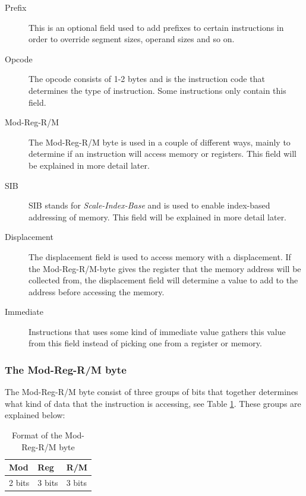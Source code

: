 \documentclass[11pt,twoside]{eitExjobb}
\begin{document}
\begin{description}
\item[Prefix] This is an optional field used to add prefixes to certain instructions in order to override segment sizes, operand sizes and so on.
\item[Opcode] The opcode consists of 1-2 bytes and is the instruction code that determines the type of instruction. Some instructions only contain this field.
\item[Mod-Reg-R/M] The Mod-Reg-R/M byte is used in a couple of different ways, mainly to determine if an instruction will access memory or registers. This field will be explained in more detail later.  
\item[SIB] SIB stands for \emph{Scale-Index-Base} and is used to enable index-based addressing of memory. This field will be explained in more detail later.
\item[Displacement] The displacement field is used to access memory with a displacement. If the Mod-Reg-R/M-byte gives the register that the memory address will be collected from, the displacement field will determine a value to add to the address before accessing the memory.
\item[Immediate] Instructions that uses some kind of immediate value gathers this value from this field instead of picking one from a register or memory.
\end{description}

\subsubsection{The Mod-Reg-R/M byte}
The Mod-Reg-R/M byte consist of three groups of bits that together determines what kind of data that the instruction is accessing, see Table \ref{table:modregrmbyte}. These groups are explained below:\\

\begin{table}[h]
\begin{tabular}{|l|l|l|}
\hline
Mod & Reg & R/M \\
\hline
2 bits & 3 bits & 3 bits \\
\hline
\end{tabular}
\caption{Format of the Mod-Reg-R/M byte}
\label{table:modregrmbyte}
\end{table}
\end{document}
